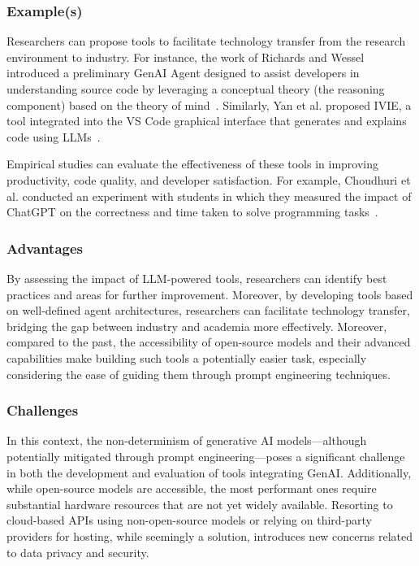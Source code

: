 \subsubsection{Example(s)}

Researchers can propose tools to facilitate technology transfer from the research environment to industry. 
For instance, the work of Richards and Wessel introduced a preliminary GenAI Agent designed to assist developers in understanding source code by leveraging a conceptual theory (the reasoning component) based on the theory of mind~\cite{DBLP:conf/icsm/RichardsW24}. 
Similarly, Yan et al. proposed IVIE, a tool integrated into the VS Code graphical interface that generates and explains code using LLMs~\cite{DBLP:conf/chi/YanHWH24}.

Empirical studies can evaluate the effectiveness of these tools in improving productivity, code quality, and developer satisfaction. 
For example, Choudhuri et al. conducted an experiment with students in which they measured the impact of ChatGPT on the correctness and time taken to solve programming tasks~\cite{DBLP:conf/icse/ChoudhuriLSGS24}.

\subsubsection{Advantages}

By assessing the impact of LLM-powered tools, researchers can identify best practices and areas for further improvement.
Moreover, by developing tools based on well-defined agent architectures, researchers can facilitate technology transfer, bridging the gap between industry and academia more effectively. Moreover, compared to the past, the accessibility of open-source models and their advanced capabilities make building such tools a potentially easier task, especially considering the ease of guiding them through prompt engineering techniques.

\subsubsection{Challenges}


In this context, the non-determinism of generative AI models—although potentially mitigated through prompt engineering—poses a significant challenge in both the development and evaluation of tools integrating GenAI. 
Additionally, while open-source models are accessible, the most performant ones require substantial hardware resources that are not yet widely available. Resorting to cloud-based APIs using non-open-source models or relying on third-party providers for hosting, while seemingly a solution, introduces new concerns related to data privacy and security.


